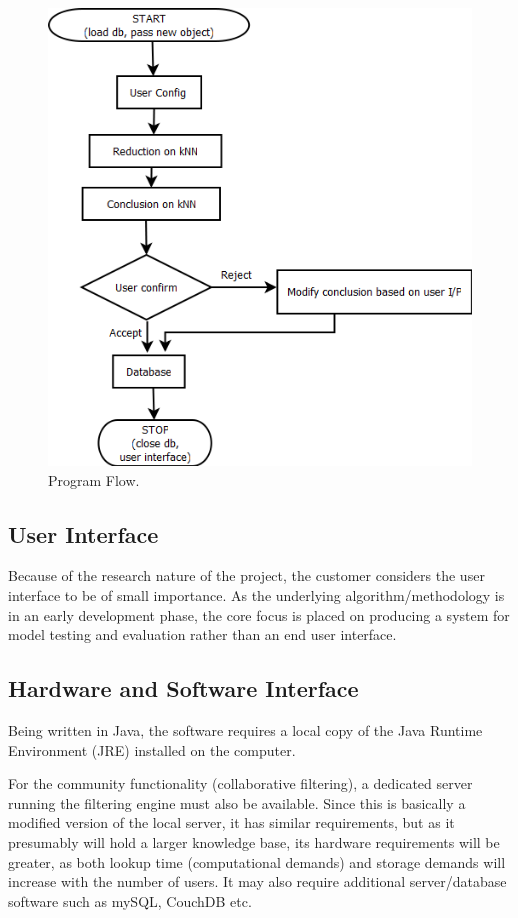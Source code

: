 \begin{figure}[htbp]
\begin{center}
\includegraphics[width = \textwidth]{DesignReport/uml/flowchart.png}
\caption{Program Flow.}
\label{ReqSpecFlow}
\end{center}
\end{figure}

\subsection{User Interface}
Because of the research nature of the project, the customer considers the user interface to be of small importance. As the underlying algorithm/methodology is in an early development phase, the core focus is placed on producing a system for model testing and evaluation rather than an end user interface. 

\subsection{Hardware and Software Interface}
Being written in Java, the software requires a local copy of the Java Runtime Environment (JRE) installed on the computer. 

For the community functionality (collaborative filtering), a dedicated server running the filtering engine must also be available. Since this is basically a modified version of the local server, it has similar requirements, but as it presumably will hold a larger knowledge base, its hardware requirements will be greater, as both lookup time (computational demands) and storage demands will increase with the number of users. It may also require additional server/database software such as mySQL, CouchDB etc. 


